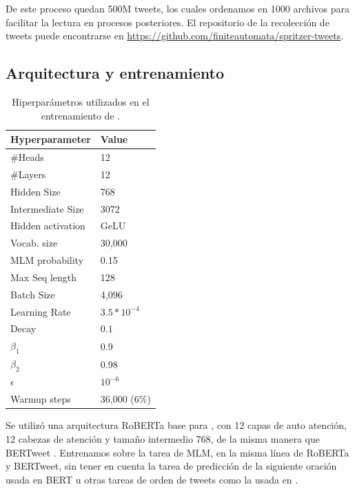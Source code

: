 De este proceso quedan 500M tweets, los cuales ordenamos en 1000 archivos para facilitar la lectura en procesos posteriores. El repositorio de la recolección de tweets puede encontrarse en \url{https://github.com/finiteautomata/spritzer-tweets}.


\subsection{Arquitectura y entrenamiento}

\begin{table}[t]
    \centering
    \begin{tabular}{l|l}
        \hline
        Hyperparameter  & Value \\
        \hline
        \#Heads           & 12             \\
        \#Layers          & 12             \\
        Hidden Size       & 768            \\
        Intermediate Size & 3072           \\
        Hidden activation & GeLU           \\
        Vocab. size       & 30,000         \\
        \hline
        MLM probability   & 0.15           \\
        Max Seq length    & 128            \\
        Batch Size        & 4,096          \\
        Learning Rate     & $3.5 * 10^{-4}$\\
        Decay             & $0.1$          \\
        $\beta_1$         & 0.9            \\
        $\beta_2$         & 0.98           \\
        $\epsilon$        & $10^{-6}$      \\
        Warmup steps      & 36,000 (6\%)   \\
        \hline
    \end{tabular}
    \caption{Hiperparámetros utilizados en el entrenamiento de \robertuito{}.}
    \label{tab:robertuito_architecture}
\end{table}

Se utilizó una arquitectura RoBERTa base para \robertuito{}, con 12 capas de auto atención, 12 cabezas de atención y tamaño intermedio 768, de la misma manera que BERTweet \cite{bertweet}. Entrenamos sobre la tarea de MLM, en la misma línea de RoBERTa y BERTweet, sin tener en cuenta la tarea de predicción de la siguiente oración usada en BERT u otras tareas de orden de tweets como la usada en \citet{gonzalez2021twilbert}.

